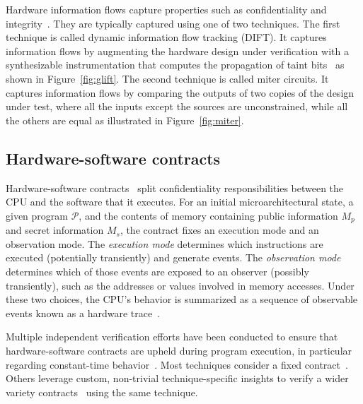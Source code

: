 Hardware information flows capture properties such as confidentiality and integrity~\cite{hu2021hardware}.
They are typically captured using one of two techniques.
The first technique is called dynamic information flow tracking (DIFT).
It captures information flows by augmenting the hardware design under verification with a synthesizable instrumentation that computes the propagation of taint bits~\cite{tiwari2009complete,ardeshiricham2017register,solt2022cellift,solt2024hybridift,ceesay2024mucfi} as shown in Figure~\ref{fig:glift}.
The second technique is called miter circuits.
It captures information flows by comparing the outputs of two copies of the design under test, where all the inputs except the sources are unconstrained, while all the others are equal as illustrated in Figure~\ref{fig:miter}.



\subsection{Hardware-software contracts}
\label{subsec:hw-sw-contracts}


Hardware-software contracts~\cite{guarnieri2021hardware} split confidentiality responsibilities between the CPU and the software that it executes.
For an initial microarchitectural state, a given program $\mathcal{P}$, and the contents of memory containing public information $M_p$ and secret information $M_s$, the contract fixes an execution mode and an observation mode.
The \emph{execution mode} determines which instructions are executed (potentially transiently) and generate events.
The \emph{observation mode} determines which of those events are exposed to an observer (possibly transiently), such as the addresses or values involved in memory accesses. Under these two choices, the CPU's behavior is summarized as a sequence of observable events known as a hardware trace~\cite{guarnieri2021hardware,oleksenko2022revizor}.



Multiple independent verification efforts have been conducted to ensure that hardware-software contracts are upheld during program execution, in particular regarding constant-time behavior~\cite{dinesh2024conjunct,ceesay2024mucfi,guarnieri2021hardware,tan2025contractshadowlogic,dinesh2025h,hsiao2024rtl2mmupath,wang2023specification}.
Most techniques consider a fixed contract~\cite{dinesh2024conjunct,ceesay2024mucfi,tan2025contractshadowlogic,dinesh2025h}.
Others leverage custom, non-trivial technique-specific insights to verify a wider variety contracts~\cite{hsiao2024rtl2mmupath,wang2023specification} using the same technique.

